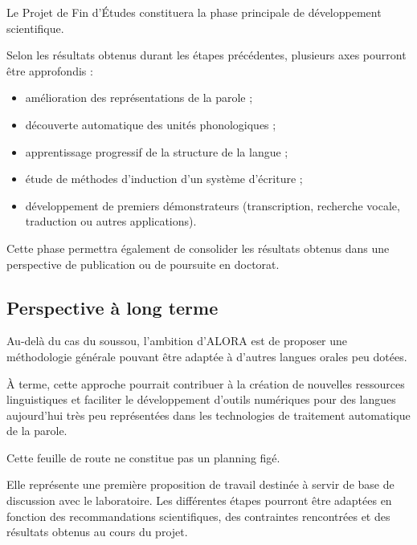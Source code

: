 Le Projet de Fin d'Études constituera la phase principale de
développement scientifique.

Selon les résultats obtenus durant les étapes précédentes, plusieurs
axes pourront être approfondis :

\begin{itemize}

\item amélioration des représentations de la parole ;

\item découverte automatique des unités phonologiques ;

\item apprentissage progressif de la structure de la langue ;

\item étude de méthodes d'induction d'un système d'écriture ;

\item développement de premiers démonstrateurs (transcription,
recherche vocale, traduction ou autres applications).

\end{itemize}

Cette phase permettra également de consolider les résultats obtenus dans
une perspective de publication ou de poursuite en doctorat.


\subsection{Perspective à long terme}

Au-delà du cas du soussou, l'ambition d'ALORA est de proposer une
méthodologie générale pouvant être adaptée à d'autres langues orales peu
dotées.

À terme, cette approche pourrait contribuer à la création de nouvelles
ressources linguistiques et faciliter le développement d'outils
numériques pour des langues aujourd'hui très peu représentées dans les
technologies de traitement automatique de la parole.


\begin{objectif}

Cette feuille de route ne constitue pas un planning figé.

Elle représente une première proposition de travail destinée à servir de
base de discussion avec le laboratoire. Les différentes étapes pourront
être adaptées en fonction des recommandations scientifiques, des
contraintes rencontrées et des résultats obtenus au cours du projet.

\end{objectif}

